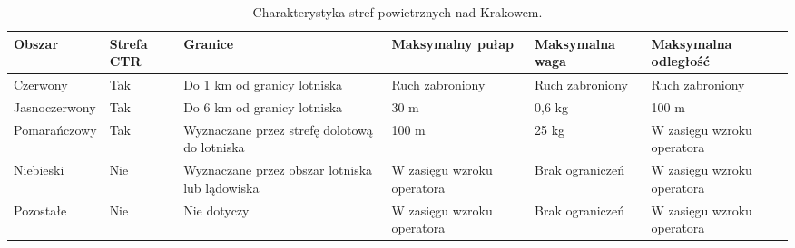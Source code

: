 \documentclass[twoside, 12pt]{article}
\begin{document}
\begin{table}[h]
	\centering
	\begin{tabular}{|l|l|p{2.2cm}|p{2.2cm}|p{2.2cm}|p{2.2cm}|}
		\hline Obszar & Strefa CTR & Granice & Maksymalny pułap & Maksymalna waga & Maksymalna odległość\\
		\hline Czerwony & Tak & Do 1 km od granicy lotniska & Ruch zabroniony & Ruch zabroniony & Ruch zabroniony\\
		\hline Jasnoczerwony & Tak & Do 6 km od granicy lotniska & 30 m & 0,6 kg & 100 m\\
		\hline Pomarańczowy & Tak & Wyznaczane przez strefę dolotową do lotniska & 100 m & 25 kg & W zasięgu wzroku operatora\\
		\hline Niebieski & Nie & Wyznaczane przez obszar lotniska lub lądowiska & W zasięgu wzroku operatora & Brak ograniczeń & W zasięgu wzroku operatora\\
		\hline Pozostałe & Nie & Nie dotyczy & W zasięgu wzroku operatora & Brak ograniczeń & W zasięgu wzroku operatora\\
		\hline
	\end{tabular}
	\caption{Charakterystyka stref powietrznych nad Krakowem.\label{tab:strefy}}
\end{table}
\end{document}
